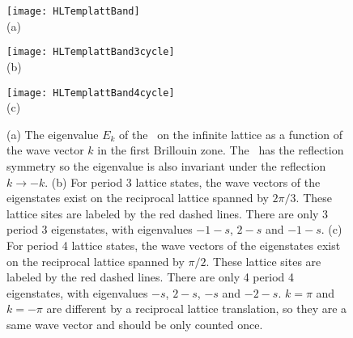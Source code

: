 \begin{description}
\begin{figure}\begin{center}
            \begin{minipage}[c]{0.3\textwidth}\begin{center}
\texttt{[image: HLTemplattBand]}\\(a)
            \end{center}\end{minipage}
            \begin{minipage}[c]{0.3\textwidth}\begin{center}
\texttt{[image: HLTemplattBand3cycle]}\\(b)
            \end{center}\end{minipage}
            \begin{minipage}[c]{0.3\textwidth}\begin{center}
\texttt{[image: HLTemplattBand4cycle]}\\(c)
            \end{center}\end{minipage}
\end{center}
  \caption{\label{fig:HLTemplattBand}
(a) The eigenvalue $E_k$ of the \jacobianOrb\ on the infinite lattice as a function of the wave
vector $k$ in the first Brillouin zone. The \jacobianOrb\ has the reflection symmetry so the
eigenvalue is also invariant under the reflection $k\to -k$.
(b) For period 3 lattice states, the wave vectors of the eigenstates exist on the reciprocal lattice
spanned by $2\pi/3$. These lattice sites are labeled by the red dashed lines. There are only
3 period 3 eigenstates, with eigenvalues $-1-s$, $2-s$ and $-1-s$.
(c) For period 4 lattice states, the wave vectors of the eigenstates exist on the reciprocal lattice
spanned by $\pi/2$. These lattice sites are labeled by the red dashed lines. There are only
4 period 4 eigenstates, with eigenvalues $-s$, $2-s$, $-s$ and $-2-s$.
$k=\pi$ and $k=-\pi$ are different by a reciprocal lattice translation, so they are a same
wave vector and should be only counted once.
          }
\end{figure}


\end{description}

